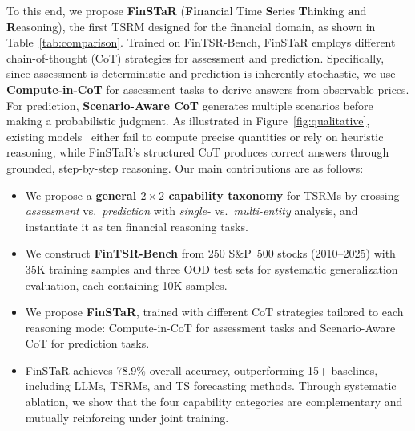 To this end, we propose \textbf{FinSTaR} (\textbf{Fin}ancial Time \textbf{S}eries \textbf{T}hinking \textbf{a}nd \textbf{R}easoning), the first TSRM designed for the financial domain,
as shown in Table~\ref{tab:comparison}.
Trained on FinTSR-Bench, FinSTaR employs different chain-of-thought (CoT) strategies for assessment and prediction.
Specifically, since assessment is deterministic and prediction is inherently stochastic, we use \textbf{Compute-in-CoT} for assessment tasks to derive answers from observable prices. For prediction, \textbf{Scenario-Aware CoT} generates multiple scenarios before making a probabilistic judgment.
As illustrated in Figure~\ref{fig:qualitative}, existing models~\cite{qwen2025qwen25,timeomni1} 
either fail to compute precise quantities or rely on heuristic reasoning, 
while FinSTaR's structured CoT produces correct answers through grounded, step-by-step reasoning.
Our main contributions are as follows:
\begin{itemize}
\item We propose a \textbf{general $2 \times 2$ capability taxonomy} for TSRMs by crossing \textit{assessment} vs.\ \textit{prediction} with \textit{single-} vs.\ \textit{multi-entity} analysis, and instantiate it as ten financial reasoning tasks.
\item We construct \textbf{FinTSR-Bench} from 250 S\&P~500 stocks (2010--2025) with 35K training samples
and three OOD test sets for systematic generalization evaluation, each containing 10K samples.
\item We propose \textbf{FinSTaR}, trained 
with different CoT strategies tailored to each reasoning mode: Compute-in-CoT for 
assessment tasks and Scenario-Aware CoT for 
prediction tasks.
\item FinSTaR achieves 78.9\% overall accuracy, outperforming 15+ baselines, including LLMs, TSRMs, and TS forecasting methods. Through systematic ablation, we show that the four capability categories are complementary and mutually reinforcing under joint training.
\end{itemize}

